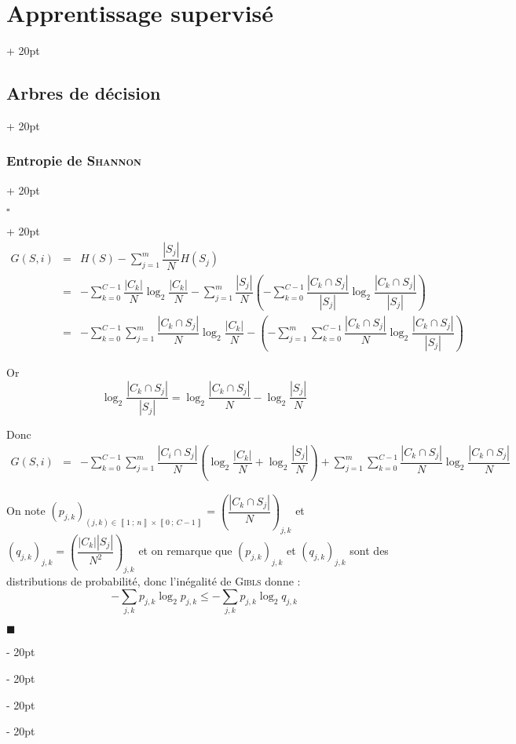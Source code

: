 \documentclass[a4paper, 12pt, twoside]{article}
\newcommand{\nset}[2]{\left\llbracket #1\ ;\ #2 \right\rrbracket}
\newcommand{\lr}[1]{\left( #1 \right)}
\newcommand{\abs}[1]{\left\lvert #1 \right\rvert}
\renewcommand{\le}{\leqslant}
\newcommand{\ind}[1][20pt]{\advance\leftskip + #1}
\newcommand{\deind}[1][20pt]{\advance\leftskip - #1}
\newenvironment{indt}[2][20pt]{#2 \par \ind[#1]}{\par \deind} %
\newenvironment{proof}[1][{}]{\begin{indt}{$\square$ #1}}{$\blacksquare$ \end{indt}}
\begin{document}
\begin{indt}{\section{Apprentissage supervisé}}
\begin{indt}{\subsection{Arbres de décision}}
\begin{indt}{\subsubsection{Entropie de \textsc{Shannon}}}
                \vspace{6pt}
                
                \begin{proof}
                    \[
                        \begin{array}{rcl}
                            G(S, i)
                            &=& \displaystyle
                            H(S) - \sum_{j = 1}^m \dfrac{\abs{S_j}}{N} H(S_j)
                            \\
                            &=& \displaystyle
                            - \sum_{k = 0}^{C - 1} \dfrac{\abs{C_k}}{N} \log_2 \dfrac{\abs{C_k}}{N}
                            - \sum_{j = 1}^m \dfrac{\abs{S_j}}{N} \lr{
                                -\sum_{k = 0}^{C - 1} \dfrac{\abs{C_k \cap S_j}}{\abs{S_j}} \log_2 \dfrac{\abs{C_k \cap S_j}}{\abs{S_j}}
                            }
                            \\
                            &=& \displaystyle
                            -\sum_{k = 0}^{C - 1} \sum_{j = 1}^m \dfrac{\abs{C_k \cap S_j}}{N}\log_2 \dfrac{\abs{C_k}}{N}
                            - \lr{
                                -\sum_{j = 1}^m \sum_{k = 0}^{C - 1} \dfrac{\abs{C_k \cap S_j}}{N} \log_2 \dfrac{\abs{C_k \cap S_j}}{\abs{S_j}}
                            }
                        \end{array}
                    \]

                    Or
                    \[
                        \log_2 \dfrac{\abs{C_k \cap S_j}}{\abs{S_j}}
                        = \log_2 \dfrac{\abs{C_k \cap S_j}}{N}
                        - \log_2 \dfrac{\abs{S_j}}{N}
                    \]

                    Donc
                    \[
                        \begin{array}{rcl}
                            G(S, i)
                            &=&\displaystyle
                            - \sum_{k = 0}^{C - 1} \sum_{j = 1}^m \dfrac{\abs{C_i \cap S_j}}{N} \lr{\log_2 \dfrac{\abs{C_k}}{N} + \log_2 \dfrac{\abs{S_j}}{N}}
                            + \sum_{j = 1}^m \sum_{k = 0}^{C - 1} \dfrac{\abs{C_k \cap S_j}}{N} \log_2 \dfrac{\abs{C_k \cap S_j}}{N}
                        \end{array}
                    \]

                    On note $\displaystyle \lr{p_{j, k}}_{(j, k) \in \nset 1 n \times \nset 0 {C - 1}} = \lr{\dfrac{\abs{C_k \cap S_j}}{N}}_{j, k}$
                    et $\displaystyle \lr{q_{j, k}}_{j, k} = \lr{\dfrac{\abs{C_k} \abs{S_j}}{N^2}}_{j, k}$
                    et on remarque que $\lr{p_{j, k}}_{j, k}$ et $\lr{q_{j, k}}_{j, k}$ sont des distributions de probabilité, donc l'inégalité de \textsc{Gibls} donne :
                    \[
                        - \sum_{j, k} p_{j, k} \log_2 p_{j, k}
                        \le
                        - \sum_{j, k} p_{j, k}\log_2 q_{j, k}
                    \]


\end{proof}
\end{indt}
\end{indt}
\end{indt}
\end{document}
